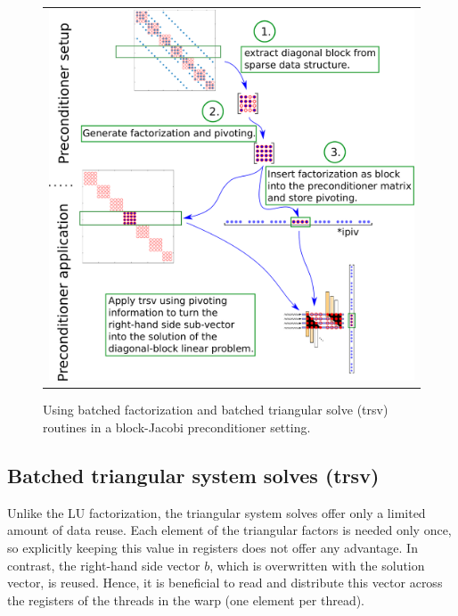 \begin{figure}
\begin{center}
\begin{tabular}{c}
\includegraphics[width=.8\columnwidth]{plots/fact_based_blockJacobi}
\end{tabular}
\end{center}
\caption{Using batched factorization and batched triangular solve ({\sc trsv}) 
         routines in a block-Jacobi preconditioner setting.%
}
\label{2017-lu-block-jacobi:fig:precscheme}
\end{figure}



\subsection{Batched triangular system solves ({\sc trsv})}

Unlike the LU factorization,
the triangular system solves offer only a limited amount of data reuse.
Each element of the triangular factors is needed only once,
so explicitly keeping this value in registers does not offer any advantage.
In contrast, the right-hand side vector $b$, which is overwritten with the solution 
vector, is reused.
Hence, it is beneficial to read and distribute this vector across the registers
of the threads in the warp (one element per thread).

